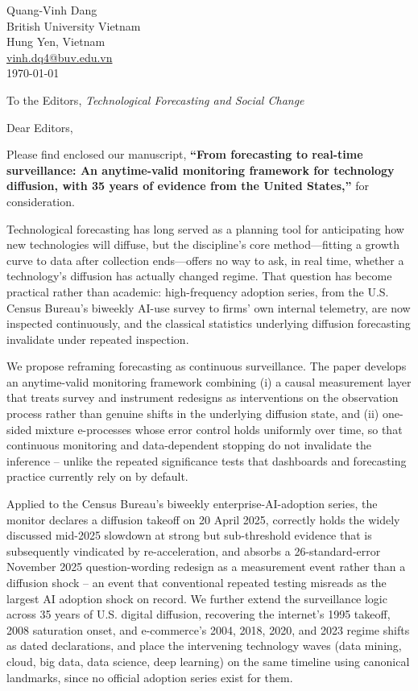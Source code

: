 \documentclass[11pt]{article}
\begin{document}
\begin{flushleft}
Quang-Vinh Dang\\
British University Vietnam\\
Hung Yen, Vietnam\\
\href{mailto:vinh.dq4@buv.edu.vn}{vinh.dq4@buv.edu.vn}\\[12pt]
\today\\[12pt]
\end{flushleft}

\noindent To the Editors, \emph{Technological Forecasting and Social Change}

\vspace{10pt}
\noindent Dear Editors,

\vspace{6pt}
\noindent Please find enclosed our manuscript, \textbf{``From forecasting to real-time surveillance: An anytime-valid monitoring framework for technology diffusion, with 35 years of evidence from the United States,''} for consideration.

Technological forecasting has long served as a planning tool for anticipating how new technologies will diffuse, but the discipline's core method---fitting a growth curve to data after collection ends---offers no way to ask, in real time, whether a technology's diffusion has actually changed regime. That question has become practical rather than academic: high-frequency adoption series, from the U.S. Census Bureau's biweekly AI-use survey to firms' own internal telemetry, are now inspected continuously, and the classical statistics underlying diffusion forecasting invalidate under repeated inspection.

We propose reframing forecasting as continuous surveillance. The paper develops an anytime-valid monitoring framework combining (i) a causal measurement layer that treats survey and instrument redesigns as interventions on the observation process rather than genuine shifts in the underlying diffusion state, and (ii) one-sided mixture e-processes whose error control holds uniformly over time, so that continuous monitoring and data-dependent stopping do not invalidate the inference -- unlike the repeated significance tests that dashboards and forecasting practice currently rely on by default.

Applied to the Census Bureau's biweekly enterprise-AI-adoption series, the monitor declares a diffusion takeoff on 20 April 2025, correctly holds the widely discussed mid-2025 slowdown at strong but sub-threshold evidence that is subsequently vindicated by re-acceleration, and absorbs a 26-standard-error November 2025 question-wording redesign as a measurement event rather than a diffusion shock -- an event that conventional repeated testing misreads as the largest AI adoption shock on record. We further extend the surveillance logic across 35 years of U.S. digital diffusion, recovering the internet's 1995 takeoff, 2008 saturation onset, and e-commerce's 2004, 2018, 2020, and 2023 regime shifts as dated declarations, and place the intervening technology waves (data mining, cloud, big data, data science, deep learning) on the same timeline using canonical landmarks, since no official adoption series exist for them.
\end{document}
